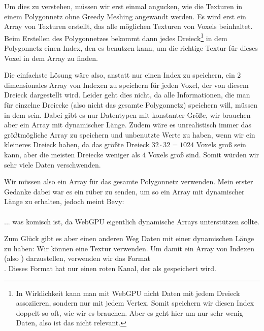 \pagebreak

Um dies zu verstehen, müssen wir erst einmal angucken,
wie die Texturen in einem Polygonnetz ohne
Greedy Meshing angewandt werden.
Es wird erst ein Array von Texturen erstellt,
das alle möglichen Texturen von Voxels beinhaltet.
Beim Erstellen des Polygonnetzes bekommt
dann jedes Dreieck\footnote{
	In Wirklichkeit kann man mit WebGPU nicht
	Daten mit jedem Dreieck assoziieren,
	sondern nur mit jedem Vertex.
	Somit speichern wir diesen Index doppelt so
	oft, wie wir es brauchen.
	Aber es geht hier um nur sehr wenig Daten,
	also ist das nicht relevant.
}
in dem Polygonnetz einen Index,
den es benutzen kann, um die richtige Textur für
dieses Voxel in dem Array zu finden.

Die einfachste Lösung wäre also, anstatt nur
einen Index zu speichern, ein 2 dimensionales Array
von Indexen zu speichern für jeden Voxel,
der von diesem Dreieck dargestellt wird.
Leider geht dies nicht, da alle Informationen,
die man für einzelne Dreiecke (also nicht das
gesamte Polygonnetz) speichern will, müssen in dem
\href{https://gpuweb.github.io/gpuweb/#enumdef-gpuvertexformat}{}\cite{gpu_vertex_format}
sein.
Dabei gibt es nur Datentypen mit konstanter Größe,
wir brauchen aber ein Array mit dynamischer Länge.
Zudem wäre es unrealistisch immer das größtmögliche
Array zu speichern und unbenutzte Werte zu haben,
wenn wir ein kleineres Dreieck haben, da das größte
Dreieck $32 \cdot 32 = 1024$ Voxels groß sein kann,
aber die meisten Dreiecke weniger als $4$ Voxels
groß sind.
Somit würden wir sehr viele Daten verschwenden.

Wir müssen also ein Array für das gesamte
Polygonnetz verwenden.
Mein erster Gedanke dabei war es ein 
rüber zu senden, um so ein Array mit dynamischer
Länge zu erhalten, jedoch meint Bevy:\\
\cite{no_runtime_sized}\\
... was komisch ist, da WebGPU eigentlich dynamische
Arrays unterstützen sollte.

Zum Glück gibt es aber einen anderen Weg Daten mit
einer dynamischen Länge zu haben:
Wir können eine Textur verwenden.
Um damit ein Array von Indexen (also )
darzustellen, verwenden wir das Format\\
\href{https://docs.rs/bevy/0.15.0/bevy/render/render_resource/enum.TextureFormat.html#variant.R32Uint}{}\cite{r32uint}.
Dieses Format hat nur einen roten Kanal, der als
 gespeichert wird.

